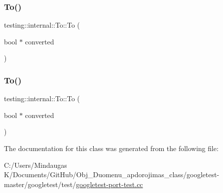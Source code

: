 \subsubsection{\texorpdfstring{To()}{To()}\hspace{0.1cm}{\footnotesize\ttfamily [2/3]}}
{\footnotesize\ttfamily testing\+::internal\+::\+To\+::\+To (\begin{DoxyParamCaption}\item[{bool $\ast$}]{converted }\end{DoxyParamCaption})\hspace{0.3cm}{\ttfamily [inline]}}

\mbox{\label{classtesting_1_1internal_1_1_to_a447354e55d855ed0f1a1de8b2b54d345}} 
\subsubsection{\texorpdfstring{To()}{To()}\hspace{0.1cm}{\footnotesize\ttfamily [3/3]}}
{\footnotesize\ttfamily testing\+::internal\+::\+To\+::\+To (\begin{DoxyParamCaption}\item[{bool $\ast$}]{converted }\end{DoxyParamCaption})\hspace{0.3cm}{\ttfamily [inline]}}



The documentation for this class was generated from the following file\+:\begin{DoxyCompactItemize}
\item 
C\+:/\+Users/\+Mindaugas K/\+Documents/\+Git\+Hub/\+Obj\+\_\+\+Duomenu\+\_\+apdorojimas\+\_\+class/googletest-\/master/googletest/test/\mbox{\hyperlink{googletest-master_2googletest_2test_2googletest-port-test_8cc}{googletest-\/port-\/test.\+cc}}\end{DoxyCompactItemize}
